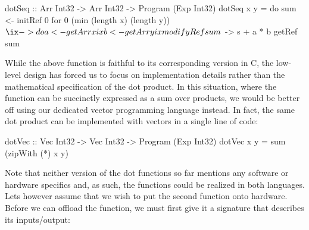 \documentclass[../main.tex]{subfiles}
\begin{document}
\begin{code}
dotSeq :: Arr Int32 -> Arr Int32 -> Program (Exp Int32)
dotSeq x y = do
  sum <- initRef 0
  for 0 (min (length x) (length y)) $ \ix -> do
    a <- getArr x ix
    b <- getArr y ix
    modifyRef sum $ \s -> s + a * b
  getRef sum
\end{code}

While the above function is faithful to its corresponding version in C, the low-level design has forced us to focus on implementation details rather than the mathematical specification of the dot product. In this situation, where the function can be succinctly expressed as a sum over products, we would be better off using our dedicated vector programming language instead. In fact, the same dot product can be implemented with vectors in a single line of code:

\begin{code}
dotVec :: Vec Int32 -> Vec Int32 -> Program (Exp Int32)
dotVec x y = sum (zipWith (*) x y)
\end{code}


Note that neither version of the dot functions so far mentions any software or hardware specifics and, as such, the functions could be realized in both languages. Lets however assume that we wish to put the second function onto hardware. Before we can offload the function, we must first give it a signature that describes its inputs/output:



\end{document}
